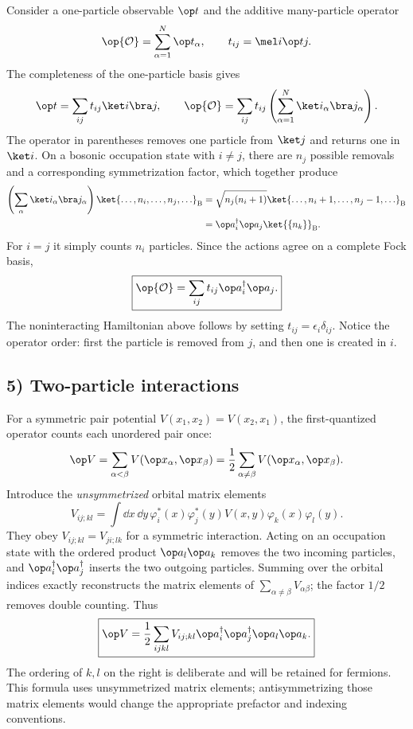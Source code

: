 Consider a one-particle observable $\op t$ and the additive many-particle operator
\[\op{\mathcal O}=\sum_{\alpha=1}^N\op t_\alpha,\qquad
 t_{ij}=\mel i{\op t}j.\]
The completeness of the one-particle basis gives
\[\op t=\sum_{ij}t_{ij}\ket i\bra j,\qquad
\op{\mathcal O}=\sum_{ij}t_{ij}\left(\sum_{\alpha=1}^N\ket i_\alpha\bra j_\alpha\right).\]
The operator in parentheses removes one particle from $\ket j$ and returns one in $\ket i$. On a bosonic occupation state with $i\ne j$, there are $n_j$ possible removals and a corresponding symmetrization factor, which together produce
\[\begin{aligned}
\left(\sum_{\alpha}\ket i_\alpha\bra j_\alpha\right)
 \ket{\ldots,n_i,\ldots,n_j,\ldots}_{\mathrm B}
 &=\sqrt{n_j(n_i+1)}
 \ket{\ldots,n_i+1,\ldots,n_j-1,\ldots}_{\mathrm B}\\
 &=\op a_i^\dagger\op a_j\ket{\{n_k\}}_{\mathrm B}.
\end{aligned}\]
For $i=j$ it simply counts $n_i$ particles. Since the actions agree on a complete Fock basis,
\[\boxed{\op{\mathcal O}=\sum_{ij}t_{ij}\op a_i^\dagger\op a_j.}\]
The noninteracting Hamiltonian above follows by setting $t_{ij}=\epsilon_i\delta_{ij}$. Notice the operator order: first the particle is removed from $j$, and then one is created in $i$.

\subsection*{5) Two-particle interactions}

For a symmetric pair potential $V(x_1,x_2)=V(x_2,x_1)$, the first-quantized operator counts each unordered pair once:
\[\op V=\sum_{\alpha<\beta}V(\op x_\alpha,\op x_\beta)
 =\frac12\sum_{\alpha\ne\beta}V(\op x_\alpha,\op x_\beta).\]
Introduce the \emph{unsymmetrized} orbital matrix elements
\[V_{ij;kl}=\int\dd x\,\dd y\,
  \varphi_i^*(x)\varphi_j^*(y)V(x,y)\varphi_k(x)\varphi_l(y).\]
They obey $V_{ij;kl}=V_{ji;lk}$ for a symmetric interaction. Acting on an occupation state with the ordered product $\op a_l\op a_k$ removes the two incoming particles, and $\op a_i^\dagger\op a_j^\dagger$ inserts the two outgoing particles. Summing over the orbital indices exactly reconstructs the matrix elements of $\sum_{\alpha\ne\beta}V_{\alpha\beta}$; the factor $1/2$ removes double counting. Thus
\[\boxed{\op V=\frac12\sum_{ijkl}V_{ij;kl}
\op a_i^\dagger\op a_j^\dagger\op a_l\op a_k.}\]
The ordering of $k,l$ on the right is deliberate and will be retained for fermions. This formula uses unsymmetrized matrix elements; antisymmetrizing those matrix elements would change the appropriate prefactor and indexing conventions.